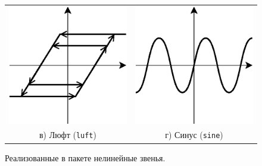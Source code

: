 \begin{figure}[h]
\begin{tabular}{cc}
\includegraphics{func_luft} &
\includegraphics{func_sine} \\
в) Люфт ({\tt luft}) & г) Синус ({\tt sine}) \\
\end{tabular}
\caption{Реализованные в пакете нелинейные звенья.}
\label{fig:nonlinear_functions}
\end{figure}

